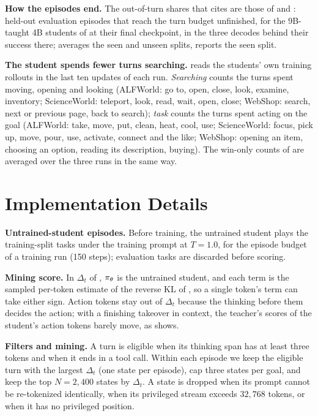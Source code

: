 \textbf{How the episodes end.} The out-of-turn shares that  cites are those of  and : held-out evaluation episodes that reach the turn budget unfinished, for the 9B-taught 4B students of  at their final checkpoint, in the three decodes behind their success there;  averages the seen and unseen splits,  reports the seen split.

\textbf{The \method{} student spends fewer turns searching.}  reads the students' own training rollouts in the last ten updates of each run. \emph{Searching} counts the turns spent moving, opening and looking (ALFWorld: go to, open, close, look, examine, inventory; ScienceWorld: teleport, look, read, wait, open, close; WebShop: search, next or previous page, back to search); \emph{task} counts the turns spent acting on the goal (ALFWorld: take, move, put, clean, heat, cool, use; ScienceWorld: focus, pick up, move, pour, use, activate, connect and the like; WebShop: opening an item, choosing an option, reading its description, buying). The win-only counts of  are averaged over the three runs in the same way.

\section{\method{} Implementation Details}
\label{app:r2s}

\textbf{Untrained-student episodes.} Before training, the untrained student plays the training-split tasks under the training prompt at $T{=}1.0$, for the episode budget of a training run (150 steps); evaluation tasks are discarded before scoring.

\textbf{Mining score.} In $\Delta_t$ of , $\pi_\theta$ is the untrained student, and each term is the sampled per-token estimate of the reverse KL of , so a single token's term can take either sign. Action tokens stay out of $\Delta_t$ because the thinking before them decides the action; with a finishing takeover in context, the teacher's scores of the student's action tokens barely move, as  shows.

\textbf{Filters and mining.} A turn is eligible when its thinking span has at least three tokens and when it ends in a tool call. Within each episode we keep the eligible turn with the largest $\Delta_t$ (one state per episode), cap three states per goal, and keep the top $N{=}2{,}400$ states by $\Delta_t$. A state is dropped when its prompt cannot be re-tokenized identically, when its privileged stream exceeds $32{,}768$ tokens, or when it has no privileged position.

